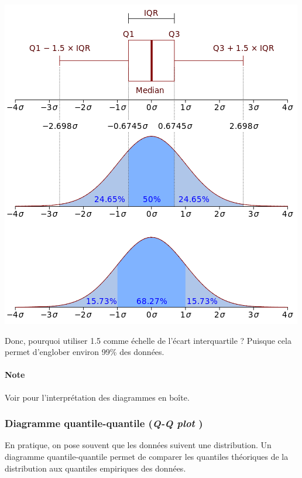 \documentclass[french]{article}
\begin{document}
\begin{multicols*}{2}
\begin{center}
	\includegraphics[scale=0.4]{../../src/ACT-2000/boxplot-normrule.png}
\end{center}


Donc, pourquoi utiliser 1.5 comme échelle de l'écart interquartile ? Puisque cela permet d'englober environ 99\% des données.

\paragraph{Note}	Voir \textit{\underline{}} pour l'interprétation des diagrammes en boîte.


\columnbreak
\subsubsection{Diagramme quantile-quantile (\og \textit{Q-Q plot} \fg{})}\label{subsubsec:OrderStatsQQPlot}
En pratique, on pose souvent que les données suivent une distribution. Un diagramme quantile-quantile permet de comparer les quantiles théoriques de la distribution aux quantiles empiriques des données. 

\bigskip


\end{multicols*}
\end{document}

